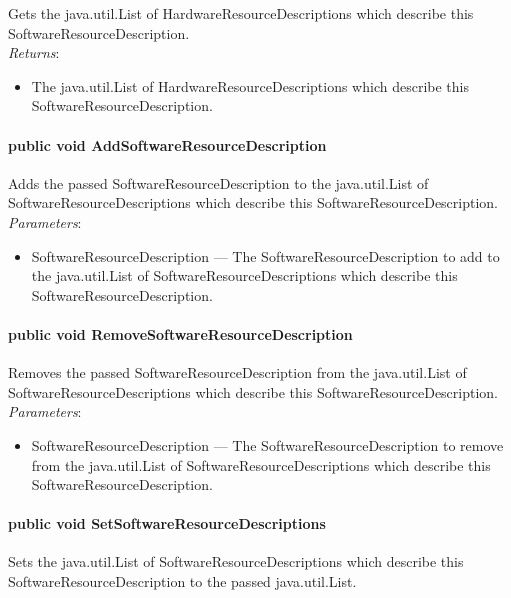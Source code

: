 \documentclass[$Date: 2003/06/26 19:29:31 $]{glabarticle}
\begin{document}
Gets the java.util.List of HardwareResourceDescriptions which describe this
SoftwareResourceDescription. \\

\textit{Returns}:
\begin{itemize}
\item[] The java.util.List of HardwareResourceDescriptions which describe this 
SoftwareResourceDescription.
\end{itemize}

\paragraph{public void AddSoftwareResourceDescription}

Adds the passed SoftwareResourceDescription to the java.util.List of
SoftwareResourceDescriptions which describe this
SoftwareResourceDescription. \\

\textit{Parameters}:
\begin{itemize}
\item[] SoftwareResourceDescription --- The SoftwareResourceDescription to add to the java.util.List of 
SoftwareResourceDescriptions which describe this SoftwareResourceDescription.
\end{itemize}
 
\paragraph{public void RemoveSoftwareResourceDescription}

Removes the passed SoftwareResourceDescription from the java.util.List of
SoftwareResourceDescriptions which describe this
SoftwareResourceDescription. \\

\textit{Parameters}:
\begin{itemize}
\item[] SoftwareResourceDescription --- The SoftwareResourceDescription to remove from the java.util.List 
of SoftwareResourceDescriptions which describe this SoftwareResourceDescription.
\end{itemize}

\paragraph{public void SetSoftwareResourceDescriptions}

Sets the java.util.List of SoftwareResourceDescriptions which describe this
SoftwareResourceDescription to the passed java.util.List. \\
\end{document}
